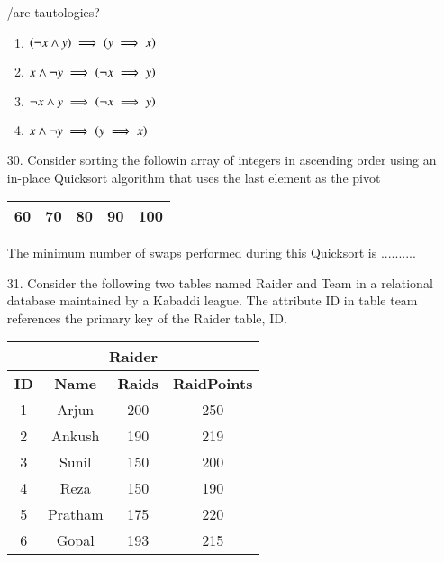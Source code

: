 \documentclass[journal]{IEEEtran}
\begin{document}
\begin{enumerate}
    /are tautologies?
    \begin{enumerate}[label = (\Alph*)]
        \item $\left(\neg x \land y\right)\implies \left(y\implies x\right) $
        \item ${ x \land \neg y}\implies \left(\neg x \implies y\right) $
        \item ${\neg x \land y}\implies \left(\neg x \implies y\right) $
        \item ${ x \land\neg y}\implies \left(y\implies x\right) $
    \end{enumerate}
    \item[30.] Consider sorting the followin array of integers in ascending order using an in-place Quicksort algorithm that uses the last element as the pivot 
    \begin{table}
        \centering
        \begin{tabular}{|c|c|c|c|c|}
            \hline
            60&70&80&90&100\\
            \hline 
        \end{tabular}
    \end{table}
    The minimum number of swaps performed during this Quicksort is ..........
    \item[31.] Consider the following two tables named Raider and Team in a relational database maintained by a Kabaddi league. The attribute ID in table team references the primary key of the Raider table, ID. 
    \begin{table}
        \centering
        \begin{tabular}{|c|c|c|c|}
            \hline
            \multicolumn{4}{|c|}{\textbf{Raider}} \\
            \hline
            \textbf{ID} & \textbf{Name} & \textbf{Raids} & \textbf{RaidPoints} \\
            \hline
            1 & Arjun & 200 & 250 \\
            2 & Ankush & 190 & 219 \\
            3 & Sunil & 150 & 200 \\
            4 & Reza & 150 & 190 \\
            5 & Pratham & 175 & 220 \\
            6 & Gopal & 193 & 215 \\
            \hline
        \end{tabular}
    \end{table}
    \begin{table}
        \centering
        \renewcommand{\arraystretch}{1.2} %

\end{table}
\end{enumerate}
\end{document}
